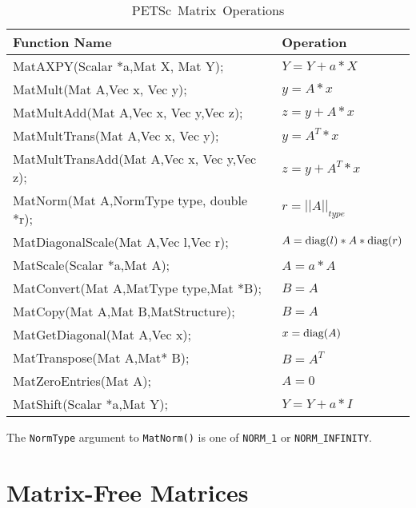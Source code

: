 \begin{table}[H]
\begin{center}
\begin{tabular}{ll}
{\bf Function Name} & {\bf Operation} \\
\hline
MatAXPY(Scalar *a,Mat X, Mat Y); & $ Y = Y + a*X $ \\
MatMult(Mat A,Vec x, Vec y); & $ y = A*x $ \\
MatMultAdd(Mat A,Vec x, Vec y,Vec z); & $ z = y + A*x $ \\
MatMultTrans(Mat A,Vec x, Vec y); & $ y = A^{T}*x $ \\
MatMultTransAdd(Mat A,Vec x, Vec y,Vec z); & $ z = y + A^{T}*x $ \\
MatNorm(Mat A,NormType type,  double *r); & $ r = ||A||_{type}$ \\
MatDiagonalScale(Mat A,Vec l,Vec r); & $ A = \hbox{diag}(l)*A*\hbox{diag}(r) $ \\
MatScale(Scalar *a,Mat A); & $ A = a*A $ \\
MatConvert(Mat A,MatType type,Mat *B); & $ B = A $ \\
MatCopy(Mat A,Mat B,MatStructure); &  $ B = A $ \\
MatGetDiagonal(Mat A,Vec x); & $ x = \hbox{diag}(A)$ \\
MatTranspose(Mat A,Mat* B); & $ B = A^{T} $ \\
MatZeroEntries(Mat A); & $ A = 0 $ \\
MatShift(Scalar *a,Mat Y); & $ Y =  Y + a*I $ \\
\hline 
\end{tabular}
\end{center}
\caption{\hbox{PETSc Matrix Operations}}
\label{fig:matrixops}
\end{table}
The {\tt NormType} argument to {\tt MatNorm()} is one of 
 {\tt NORM\_1} or {\tt NORM\_INFINITY}.
  
 

\section{Matrix-Free Matrices} 

